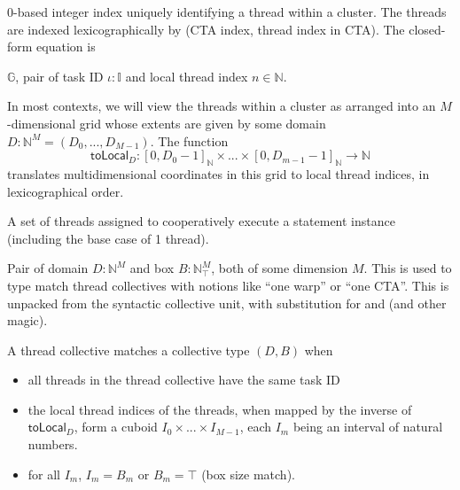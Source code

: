 
0-based integer index uniquely identifying a thread within a cluster.
The threads are indexed lexicographically by (CTA index, thread index in CTA).
The closed-form equation is 


$\mathbb{G}$, pair of task ID $\iota: \mathbb{I}$ and local thread index $n \in \mathbb{N}$.


In most contexts, we will view the threads within a cluster as arranged into an $M$-dimensional grid whose extents are given by some domain $D: \mathbb{N}^M = (D_0, ..., D_{M-1})$.
The function
\begin{equation}
    \mathsf{toLocal}_D: [0, D_0-1]_\mathbb{N} \times ... \times [0, D_{m-1} - 1]_\mathbb{N} \to \mathbb{N}
\end{equation}
translates multidimensional coordinates in this grid to local thread indices, in lexicographical order.


A set of threads assigned to cooperatively execute a statement instance (including the base case of 1 thread).


Pair of domain $D: \mathbb{N}^M$ and box $B: \mathbb{N}_\top^M$, both of some dimension $M$.
This is used to type match thread collectives with notions like ``one warp'' or ``one CTA''.
This is unpacked from the syntactic collective unit, with substitution for  and  (and other magic).

A thread collective matches a collective type $(D, B)$ when
\begin{itemize}
  \item all threads in the thread collective have the same task ID
  \item the local thread indices of the threads, when mapped by the inverse of $\mathsf{toLocal}_D$, form a cuboid $I_0 \times ... \times I_{M-1}$, each $I_m$ being an interval of natural numbers.
  \item for all $I_m$, $I_m = B_m$ or $B_m = \top$ (box size match).
\end{itemize}

